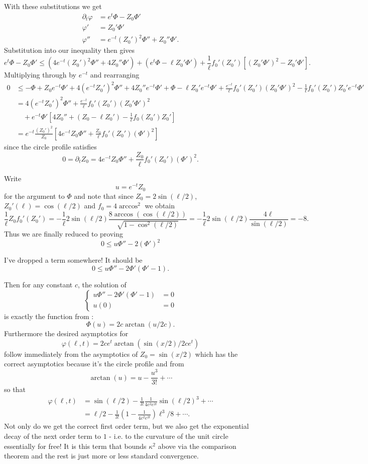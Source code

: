 \documentclass{amsart}
\begin{document}
With these substitutions we get
\begin{align*}
\partial_t \varphi &= e^t \Phi - Z_0 \Phi' \\
\varphi' &= Z_0' \Phi' \\
\varphi'' &= e^{-t} (Z_0')^2 \Phi'' + Z_0'' \Phi'.
\end{align*}
Substitution into our inequality then gives
\[
e^t \Phi - Z_0 \Phi' \leq (4 e^{-t} (Z_0')^2 \Phi'' + 4 Z_0'' \Phi') + (e^t \Phi - \ell Z_0' \Phi') + \frac{1}{\ell} f_0'(Z_0')[(Z_0' \Phi')^2 - Z_0'\Phi'].
\]
Multiplying through by \(e^{-t}\) and rearranging
\[
\begin{split}
0 &\leq -\Phi + Z_0 e^{-t} \Phi' + 4 (e^{-t} Z_0')^2 \Phi'' + 4 Z_0'' e^{-t} \Phi' + \Phi - \ell Z_0' e^{-t}\Phi'+ \frac{e^{-t}}{\ell} f_0'(Z_0')(Z_0' \Phi')^2 - \frac{1}{\ell} f_0'(Z_0') Z_0' e^{-t} \Phi' \\
&= 4 (e^{-t} Z_0')^2 \Phi'' + \frac{e^{-t}}{\ell} f_0'(Z_0') (Z_0' \Phi')^2 \\
&\quad + e^{-t}\Phi'\left[4Z_0'' + (Z_0 - \ell Z_0') - \frac{1}{\ell} f_0(Z_0') Z_0'\right] \\
&= e^{-t} \frac{(Z_0')^2}{Z_0} \left[4e^{-t}Z_0 \Phi'' + \frac{Z_0}{\ell} f_0'(Z_0') (\Phi')^2\right]
\end{split}
\]
since the circle profile satisfies
\[
0 = \partial_t Z_0 = 4e^{-t}Z_0 \Phi'' + \frac{Z_0}{\ell} f_0'(Z_0') (\Phi')^2.
\]

Write
\[
u = e^{-t} Z_0
\]
for the argument to \(\Phi\) and note that since \(Z_0 = 2 \sin(\ell/2)\), \(Z_0'(\ell) = \cos(\ell/2)\) and \(f_0 = 4 \arccos^2\) we obtain
\[
\frac{1}{\ell} Z_0 f_0'(Z_0') = - \frac{1}{\ell} 2 \sin(\ell/2) \frac{8\arccos(\cos(\ell/2))}{\sqrt{1 - \cos^2(\ell/2)}} = - \frac{1}{\ell} 2 \sin(\ell/2) \frac{4\ell}{\sin(\ell/2)} = -8.
\]
Thus we are finally reduced to proving
\[
0 \leq u \Phi'' - 2 (\Phi')^2
\]

I've dropped a term somewhere! It should be
\[
0 \leq u \Phi'' - 2 \Phi'(\Phi' - 1).
\]

Then for any constant \(c\), the solution of
\[
\begin{cases}
u \Phi'' - 2 \Phi'(\Phi' - 1) &= 0 \\
u(0) &= 0
\end{cases}
\]
is exactly the function from \cite{AndrewsBryan:01/2011}:
\[
\Phi(u) = 2 c \arctan(u/2c).
\]
Furthermore the desired asymptotics for
\[
\varphi(\ell, t) = 2c e^t \arctan(\sin(x/2)/2c e^t)
\]
follow immediately from the asymptotics of \(Z_0 = \sin(x/2)\) which has the correct asymptotics because it's the circle profile and from
\[
\arctan(u) = u - \frac{u^3}{3!} + \cdots
\]
so that
\[
\begin{split}
\varphi(\ell, t) &= \sin(\ell/2) - \frac{1}{3!} \frac{1}{4c^2 e^{2t}} \sin(\ell/2)^3 + \cdots \\
&= \ell/2 - \frac{1}{3!} \left(1 - \frac{1}{4c^2 e^{2t}}\right) \ell^3/8 + \cdots.
\end{split}
\]
Not only do we get the correct first order term, but we also get the exponential decay of the next order term to \(1\) - i.e. to the curvature of the unit circle essentially for free! It is this term that bounds \(\kappa^2\) above via the comparison theorem and the rest is just more or less standard convergence.
\end{document}
